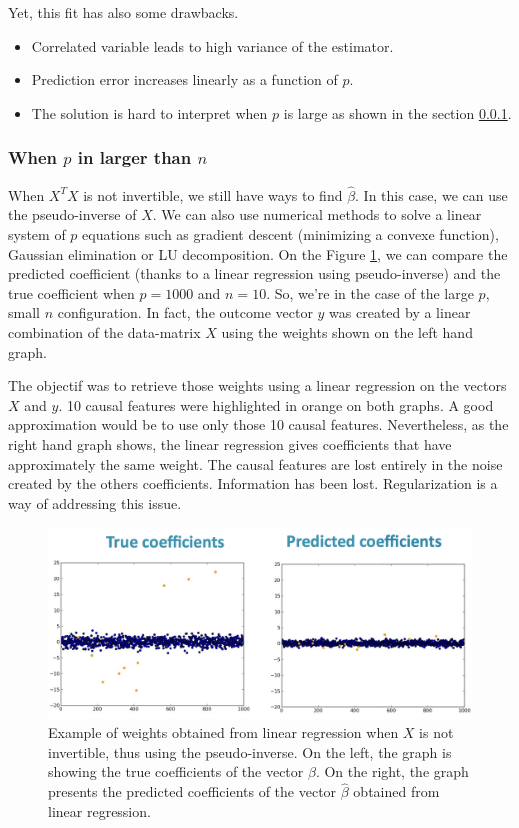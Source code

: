 \documentclass[a4paper,12pt]{article}
\begin{document}
Yet, this fit has also some drawbacks.
\begin{itemize}
\item Correlated variable leads to high variance of the estimator.
\item Prediction error increases linearly as a function of $p$.
\item The solution is hard to interpret when $p$ is large as shown in the section \ref{LargeP}.
\end{itemize}

\subsubsection{When $p$ in larger than $n$}
\label{LargeP}
When $X^T X$ is not invertible, we still have ways to find $\hat{\beta}$. In this case, we can use the pseudo-inverse of $X$. We can also use numerical methods to solve a linear system of $p$ equations such as gradient descent (minimizing a convexe function), Gaussian elimination or LU decomposition.
On the Figure \ref{LRPseudoInverse}, we can compare the predicted coefficient (thanks to a linear regression using pseudo-inverse) and the true coefficient when $p = 1000$ and $n = 10$. So, we're in the case of the large $p$, small $n$ configuration. In fact, the outcome vector $y$ was created by a linear combination of the data-matrix $X$ using the weights shown on the left hand graph. 

The objectif was to retrieve those weights using a linear regression on the vectors $X$ and $y$. 10 causal features were highlighted in orange on both graphs. A good approximation would be to use only those 10 causal features. Nevertheless, as the right hand graph shows, the linear regression gives coefficients that have approximately the same weight. The causal features are lost entirely in the noise created by the others coefficients. Information has been lost. Regularization is a way of addressing this issue.

\begin{figure}[!h]
\centerline{
\includegraphics[scale = 0.3]{Figures/linear_regression_pseudoinverse.png}}
\caption{Example of weights obtained from linear regression when $X$ is not invertible, thus using the pseudo-inverse. On the left, the graph is showing the true coefficients of the vector $\beta$. On the right, the graph presents the predicted coefficients of the vector $\hat{\beta}$ obtained from linear regression.}
\label{LRPseudoInverse}
\end{figure}
\end{document}
